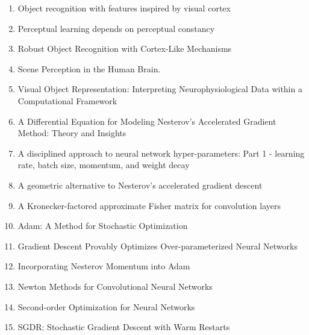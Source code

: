 \documentclass[acmlarge]{acmart}
\begin{document}
\begin{enumerate}
	\item Object recognition with features inspired by visual cortex \cite{Serre2005ObjectRW} 

	\item Perceptual learning depends on perceptual constancy \cite{Garrigan2008PerceptualLD} 

	\item Robust Object Recognition with Cortex-Like Mechanisms \cite{Serre2007RobustOR} 

	\item Scene Perception in the Human Brain. \cite{Epstein2019ScenePI} 

	\item Visual Object Representation: Interpreting Neurophysiological Data within a Computational Framework \cite{Plaut1990VisualOR} 

	\item A Differential Equation for Modeling Nesterov's Accelerated Gradient Method: Theory and Insights \cite{Su2014ADE} 

	\item A disciplined approach to neural network hyper-parameters: Part 1 - learning rate, batch size, momentum, and weight decay \cite{Smith2018ADA} 

	\item A geometric alternative to Nesterov's accelerated gradient descent \cite{Bubeck2015AGA} 

	\item A Kronecker-factored approximate Fisher matrix for convolution layers \cite{Grosse2016AKA} 

	\item Adam: A Method for Stochastic Optimization \cite{kingma2014adam} 

	\item Gradient Descent Provably Optimizes Over-parameterized Neural Networks \cite{Du2019GradientDP} 

	\item Incorporating Nesterov Momentum into Adam \cite{Dozat2016IncorporatingNM} 

	\item Newton Methods for Convolutional Neural Networks \cite{Wang2020NewtonMF} 

	\item Second-order Optimization for Neural Networks \cite{Martens2016SecondorderOF} 

	\item SGDR: Stochastic Gradient Descent with Warm Restarts \cite{Loshchilov2017SGDRSG} 


\end{enumerate}
\end{document}
